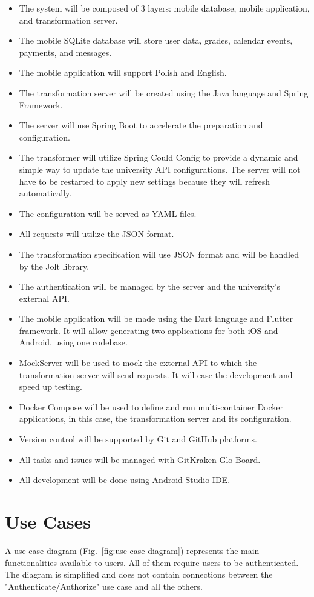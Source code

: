 \begin{itemize}
    \item The system will be composed of 3 layers: mobile database, mobile application, and transformation server.
    \item The mobile SQLite database will store user data, grades, calendar events, payments, and messages.
    \item The mobile application will support Polish and English.
    \item The transformation server will be created using the Java language and Spring Framework.
    \item The server will use Spring Boot to accelerate the preparation and configuration.
    \item The transformer will utilize Spring Could Config to provide a dynamic and simple way to update the university API configurations. The server will not have to be restarted to apply new settings because they will refresh automatically.
    \item The configuration will be served as YAML files.
    \item All requests will utilize the JSON format.
    \item The transformation specification will use JSON format and will be handled by the Jolt library.
    \item The authentication will be managed by the server and the university's external API.
    \item The mobile application will be made using the Dart language and Flutter framework. It will allow generating two applications for both iOS and Android, using one codebase.
    \item MockServer will be used to mock the external API to which the transformation server will send requests. It will ease the development and speed up testing.
    \item Docker Compose will be used to define and run multi-container Docker applications, in this case, the transformation server and its configuration.
    \item Version control will be supported by Git and GitHub platforms.
    \item All tasks and issues will be managed with GitKraken Glo Board.
    \item All development will be done using Android Studio IDE.
\end{itemize}

\section{Use Cases}
\label{section:use-cases}
A use case diagram (Fig.~\ref{fig:use-case-diagram}) represents the main functionalities available to users. All of them require users to be authenticated. The diagram is simplified and does not contain connections between the "Authenticate/Authorize" use case and all the others.

